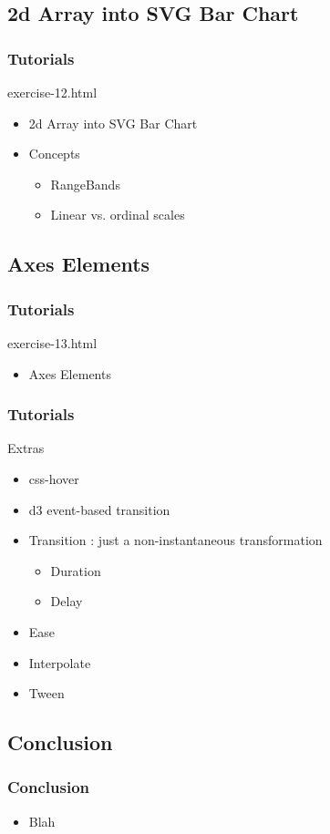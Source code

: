\documentclass{beamer}
\begin{document}
\subsection{2d Array into SVG Bar Chart}

\begin{frame}
    \frametitle{Tutorials}
    \begin{block}{exercise-12.html}
        \pause
        \begin{itemize}
        \pause
        \item 2d Array into SVG Bar Chart
        \pause
        \item Concepts
            \begin{itemize}
                \item RangeBands
                \item Linear vs. ordinal scales
            \end{itemize}
        \end{itemize}
    \end{block}
\end{frame}


\subsection{Axes Elements}

\begin{frame}
    \frametitle{Tutorials}
    \begin{block}{exercise-13.html}
        \begin{itemize}
            \pause
            \item Axes Elements
        \end{itemize} 
    \end{block}
\end{frame}


\begin{frame}
    \frametitle{Tutorials}
    \begin{block}{Extras}
        \begin{itemize}
            \item css-hover
            \item d3 event-based transition
            \item Transition : just a non-instantaneous transformation
            \begin{itemize}
                \item Duration
                \item Delay
            \end{itemize}
            \item Ease
            \item Interpolate
            \item Tween
        \end{itemize}
    \end{block}
\end{frame}


\subsection{Conclusion}

\begin{frame}
    \frametitle{Conclusion}
    \begin{itemize}
        \item Blah
    \end{itemize}
\end{frame}
\end{document}
